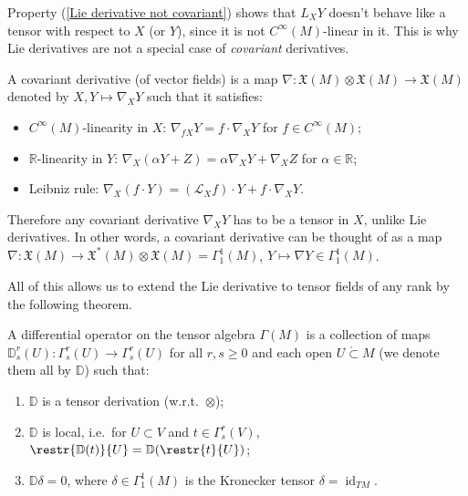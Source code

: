 \documentclass[english,letterpaper]{article}%
\numberwithin{equation}{section}
\numberwithin{figure}{section}
\numberwithin{table}{section}
\theoremstyle{definition}
\theoremstyle{definition}
\theoremstyle{definition}
\theoremstyle{plain}
\theoremstyle{plain}
\theoremstyle{plain}
\theoremstyle{plain}
\theoremstyle{remark}
\theoremstyle{remark}
\renewcommand{\geq}{\geqslant}
\DeclareMathOperator{\id}{id}
\newcommand{\Lie}{\mathcal{L}}
\newcommand{\fX}{\mathfrak{X}}
\begin{document}
\begin{rem}\label{rem: Lie derivatives not covariant}
    Property (\ref{Lie derivative not covariant}) shows that $L_X Y$ doesn't behave like a tensor with respect to $X$ (or $Y$), since it is not $C^\infty(M)$-linear in it. This is why Lie derivatives are not a special case of \emph{covariant} derivatives.
    
    A covariant derivative (of vector fields) is a map $\nabla:\fX(M)\otimes\fX(M)\to \fX(M)$ denoted by $X,Y\mapsto \nabla_X Y$ such that it satisfies:
    \begin{itemize}
        \item $C^\infty(M)$-linearity in $X$: $\nabla_{fX}Y=f\cdot \nabla_X Y$ for $f\in C^\infty(M)$;
        \item $\mathbb{R}$-linearity in $Y$: $\nabla_X (\alpha Y+Z)=\alpha \nabla_XY+\nabla_XZ$ for $\alpha\in\mathbb{R}$;
        \item Leibniz rule: $\nabla_X(f\cdot Y)=(\Lie_X f)\cdot Y+f\cdot \nabla_X Y.$
    \end{itemize}
    Therefore any covariant derivative $\nabla_X Y$ has to be a tensor in $X$, unlike Lie derivatives. In other words, a covariant derivative can be thought of as a map $\nabla:\fX(M)\to \fX^\ast(M)\otimes\fX(M)=\Gamma^1_1(M)$, $Y\mapsto \nabla Y\in\Gamma^1_1(M)$.
\end{rem}

All of this allows us to extend the Lie derivative to tensor fields of any rank by the following theorem.

\begin{defn}
A differential operator on the tensor algebra $\Gamma(M)$ is a collection of maps $\mathbb{D}^r_s(U):\Gamma^r_s(U)\to \Gamma^r_s(U)$ for all $r,s\geq 0$ and each open $U\mathring{\subset}M$ (we denote them all by $\mathbb{D}$) such that:
\begin{enumerate}
    \item $\mathbb{D}$ is a tensor derivation (w.r.t.\ $\otimes$);
    \item $\mathbb{D}$ is local, i.e.\ for $U\subset V$ and $t\in\Gamma^r_s(V)$, $\restr{\mathbb{D}(t)}{U}=\mathbb{D}(\restr{t}{U})$;
    \item $\mathbb{D} \delta=0$, where $\delta\in\Gamma^1_1(M)$ is the Kronecker tensor $\delta=\id_{TM}$.
\end{enumerate}
\end{defn}
\end{document}
